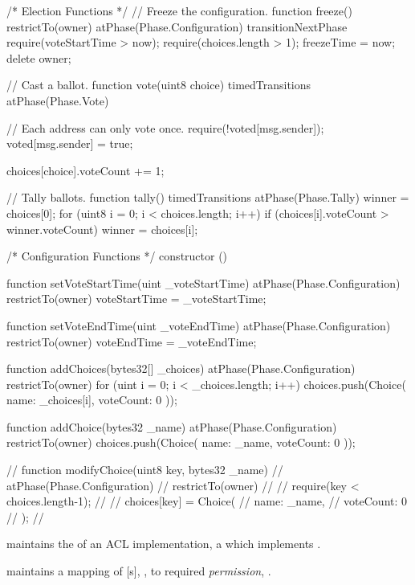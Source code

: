 \begin{solidity}
{  /* Election Functions */
  // Freeze the configuration.
  function freeze() restrictTo(owner) atPhase(Phase.Configuration) transitionNextPhase {
    require(voteStartTime > now);
    require(choices.length > 1);
    freezeTime = now;
    delete owner;
  }

  // Cast a ballot.
  function vote(uint8 choice) timedTransitions atPhase(Phase.Vote) {
    // Each address can only vote once.
    require(!voted[msg.sender]);
    voted[msg.sender] = true;

    choices[choice].voteCount += 1;
  }

  // Tally ballots.
  function tally() timedTransitions atPhase(Phase.Tally) {
    winner = choices[0];
    for (uint8 i = 0; i < choices.length; i++) {
      if (choices[i].voteCount > winner.voteCount)
        winner = choices[i];
    }
  }

  /* Configuration Functions */
  constructor () {}

  function setVoteStartTime(uint _voteStartTime) atPhase(Phase.Configuration) restrictTo(owner) {
    voteStartTime = _voteStartTime;
  }

  function setVoteEndTime(uint _voteEndTime) atPhase(Phase.Configuration) restrictTo(owner) {
    voteEndTime = _voteEndTime;
  }

  function addChoices(bytes32[] _choices) atPhase(Phase.Configuration) restrictTo(owner) {
    for (uint i = 0; i < _choices.length; i++) {
      choices.push(Choice({
        name: _choices[i],
        voteCount: 0
      }));
    }
  }

  function addChoice(bytes32 _name) atPhase(Phase.Configuration) restrictTo(owner) {
    choices.push(Choice({
      name: _name,
      voteCount: 0
    }));
  }

  //   function modifyChoice(uint8 key, bytes32 _name)
  //     atPhase(Phase.Configuration)
  //     restrictTo(owner)
  //   {
  //     require(key < choices.length-1);
  //
  //     choices[key] = Choice({
  //       name: _name,
  //       voteCount: 0
  //     });
  //   }
}
\end{solidity}

\begin{state}
  \item \attributes

  \begin{public}
    \item {} maintains the  of an ACL
      implementation, a  which implements .

    \item {} maintains a
      mapping of [s], , to required
      \emph{permission}, .
  \end{public}
\end{state}


